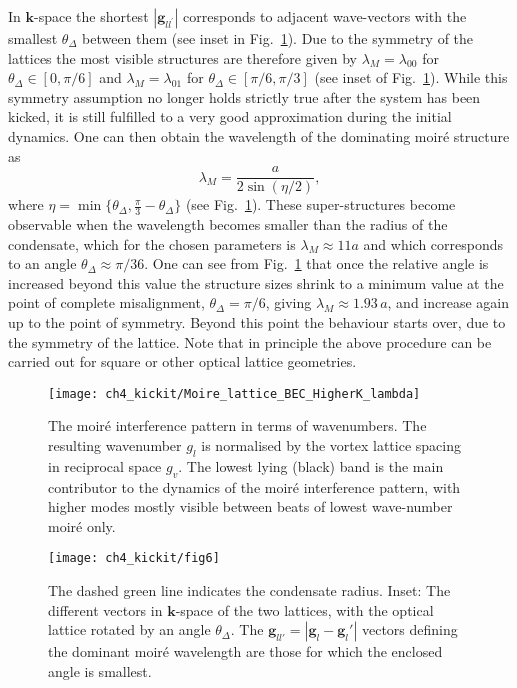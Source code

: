     In $\mathbf{k}$-space the shortest $|\mathbf{g}_{ll^\prime}|$ corresponds to adjacent wave-vectors with the smallest $\theta_\Delta$ between them (see inset in Fig.~\ref{fig:moire_lambda_1}). Due to the symmetry of the lattices the most visible structures are therefore given by $\lambda_M=\lambda_{00}$ for $\theta_\Delta\in[0,\pi/6]$ and $\lambda_M=\lambda_{01}$ for $\theta_\Delta\in[\pi/6,\pi/3]$ (see inset of Fig.~\ref{fig:moire_lambda_1}).
    While this symmetry assumption no longer holds strictly true after the system has been kicked, it is still fulfilled to a very good approximation during the initial dynamics. One can then obtain the wavelength of the dominating moir\'e structure as~\cite{BIO:Blair_jneur_2007,SS:Yankowitz_natphys_2012}
    		\begin{equation}
    		\lambda_M = \frac{a}{2\sin(\eta/2)},
    		\label{eqn:moire_size}
    	\end{equation}
    where $\eta=\min\{\theta_\Delta,\frac{\pi}{3} - \theta_\Delta \} $  (see Fig.~\ref{fig:moire_lambda_1}).
These super-structures become observable when the wavelength becomes smaller than the radius of the condensate, which for the chosen parameters is $\lambda_M \approx 11a$ and which corresponds to an angle $\theta_\Delta \approx \pi/36$.
One can see from Fig.~\ref{fig:moire_lambda_1} that once the relative angle is increased beyond this value the structure sizes shrink to a minimum value at the point of complete misalignment, $\theta_\Delta=\pi/6$, giving $\lambda_M\approx 1.93\,a$, and increase again up to the point of symmetry. Beyond this point the behaviour starts over, due to the symmetry of the lattice. Note that in principle the above procedure can be carried out for square or other optical lattice geometries.

\begin{figure}[tb]
    \centering

	\texttt{[image: ch4\_kickit/Moire\_lattice\_BEC\_HigherK\_lambda]}
    \caption[The moir\'e interference pattern in terms of wavenumbers.]{The moir\'e interference pattern in terms of wavenumbers. The resulting wavenumber $g_l$ is normalised by the vortex lattice spacing in reciprocal space $g_v$. The lowest lying (black) band is the main contributor to the dynamics of the moir\'e interference pattern, with higher modes mostly visible between beats of lowest wave-number moir\'e only.}
\end{figure}



\begin{figure}[tb]
    \centering

	\texttt{[image: ch4\_kickit/fig6]}
	\caption[Size of the resulting moir\'e super-structures as a function of the relative angle between the vortex and optical lattice.]{The dashed green line indicates the condensate radius. Inset: The different vectors in $\mathbf{k}$-space of the two lattices, with the optical lattice rotated by an angle $\theta_\Delta$. The $\mathbf{g}_{ll'} = |\mathbf{g}_l - \mathbf{g}_l'|$ vectors defining the dominant moir\'e wavelength are those for which the enclosed angle is smallest. }
	\label{fig:moire_lambda_1}
\end{figure}

